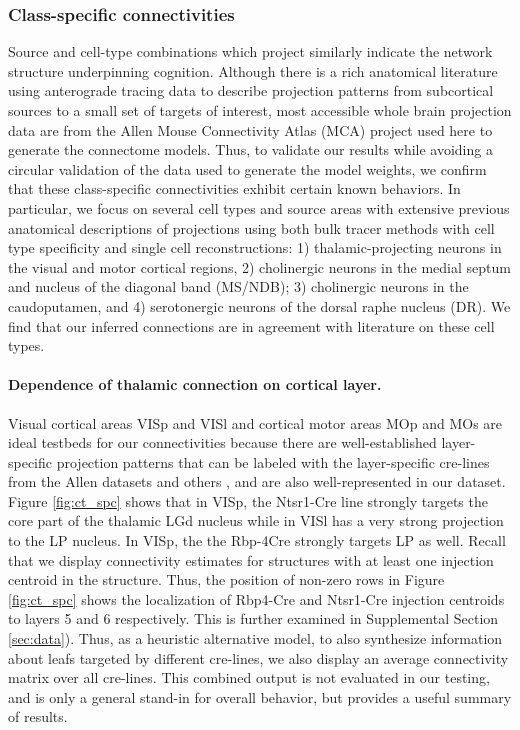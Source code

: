 \newpage
\subsubsection{Class-specific connectivities}

Source and cell-type combinations which project similarly indicate the network structure underpinning cognition.
Although there is a rich anatomical literature using anterograde tracing data to describe projection patterns from subcortical sources to a small set of targets of interest, most accessible whole brain projection data are from the Allen Mouse Connectivity Atlas (MCA) project used here to generate the connectome models.
Thus, to validate our results while avoiding a circular validation of the data used to generate the model weights, we confirm that these class-specific connectivities exhibit certain known behaviors.
In particular, we focus on several cell types and source areas with extensive previous anatomical descriptions of projections using both bulk tracer methods with cell type specificity and single cell reconstructions: 1) thalamic-projecting neurons in the visual and motor cortical regions, 2) cholinergic neurons in the medial septum and nucleus of the diagonal band (MS/NDB); 3) cholinergic neurons in the caudoputamen, and 4) serotonergic neurons of the dorsal raphe nucleus (DR).
We find that our inferred connections are in agreement with literature on these cell types.

\paragraph{Dependence of thalamic connection on cortical layer.}

Visual cortical areas VISp and VISl and cortical motor areas MOp and MOs are ideal testbeds for our connectivities because there are well-established layer-specific projection patterns that can be labeled with the layer-specific cre-lines from the Allen datasets and others \citet{Jeong2016-dc, Harris2019-mr}, and are also well-represented in our dataset.
Figure \ref{fig:ct_spc} shows that in VISp, the Ntsr1-Cre line strongly targets the core part of the thalamic LGd nucleus while in VISl has a very strong projection to the LP nucleus. In VISp, the the Rbp-4Cre strongly targets LP as well.  
Recall that we display connectivity estimates for structures with at least one injection centroid in the structure.
Thus, the position of non-zero rows in Figure \ref{fig:ct_spc} shows the localization of Rbp4-Cre and Ntsr1-Cre injection centroids to layers 5 and 6 respectively.
This is further examined in Supplemental Section \ref{sec:data}).
Thus, as a heuristic alternative model, to also synthesize information about leafs targeted by different cre-lines, we also display an average connectivity matrix over all cre-lines.
This combined output is not evaluated in our testing, and is only a general stand-in for overall behavior, but provides a useful summary of results.

